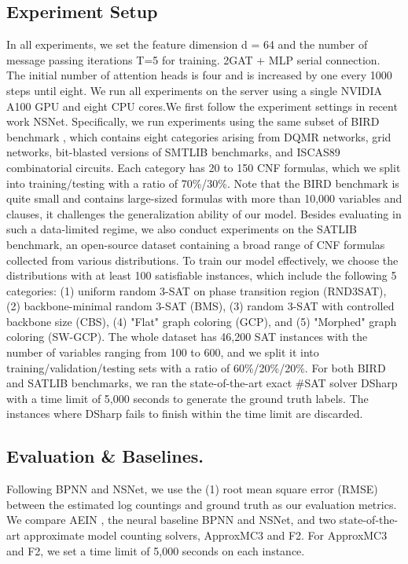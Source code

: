 \subsection{Experiment Setup}
In all experiments, we set the feature dimension d = 64 and the number of message passing iterations 
T=5 for training. 2GAT + MLP serial connection. The initial number of attention heads is four and is 
increased by one every 1000 steps until eight. We run all experiments on the server using a single 
NVIDIA A100 GPU and eight CPU cores.We first follow the experiment settings in recent work NSNet. 
Specifically, we run experiments using the same subset of BIRD benchmark\cite{A19} , which contains 
eight categories arising from DQMR networks, grid networks, bit-blasted versions of SMTLIB benchmarks, 
and ISCAS89 combinatorial circuits. Each category has 20 to 150 CNF formulas, which we split into 
training/testing with a ratio of 70\%/30\%. Note that the BIRD benchmark is quite small and contains 
large-sized formulas with more than 10,000 variables and clauses, it challenges the generalization 
ability of our model. Besides evaluating in such a data-limited regime, we also conduct experiments 
on the SATLIB benchmark, an open-source dataset containing a broad range of CNF formulas collected 
from various distributions. To train our model effectively, we choose the distributions with at least 
100 satisfiable instances, which include the following 5 categories: (1) uniform random 3-SAT on phase 
transition region (RND3SAT), (2) backbone-minimal random 3-SAT (BMS), (3) random 3-SAT with controlled 
backbone size (CBS), (4) "Flat" graph coloring (GCP), and (5) "Morphed" graph coloring (SW-GCP). The 
whole dataset has 46,200 SAT instances with the number of variables ranging from 100 to 600, and we 
split it into training/validation/testing sets with a ratio of 60\%/20\%/20\%. For both BIRD and SATLIB 
benchmarks, we ran the state-of-the-art exact \#SAT solver DSharp\cite{B7} with a time limit of 5,000 
seconds to generate the ground truth labels. The instances where DSharp fails to finish within the time 
limit are discarded.

\subsection{Evaluation \& Baselines.}
Following BPNN and NSNet, we use the (1) root mean square error (RMSE) between the estimated log 
countings and ground truth as our evaluation metrics. We compare AEIN , the neural baseline BPNN and 
NSNet, and two state-of-the-art approximate model counting solvers, ApproxMC3\cite{A19} and F2\cite{B8}. 
For ApproxMC3 and F2, we set a time limit of 5,000 seconds on each instance.

